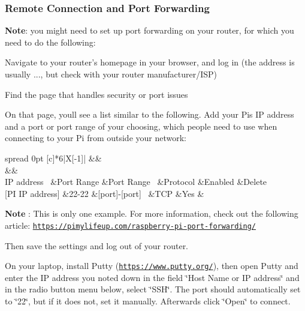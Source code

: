  \subsubsection*{Remote Connection and Port Forwarding}

{\bfseries Note}\+: you might need to set up port forwarding on your router, for which you need to do the following\+: 
\begin{DoxyEnumerate}
\item Navigate to your router’s homepage in your browser, and log in (the address is usually {...}, but check with your router manufacturer/\+I\+SP) 
\item Find the page that handles security or port issues 
\item On that page, you\textquotesingle{}ll see a list similar to the following. Add your Pi\textquotesingle{}s IP address and a port or port range of your choosing, which people need to use when connecting to your Pi from outside your network\+: \tabulinesep=1mm
\begin{longtabu} spread 0pt [c]{*{6}{|X[-1]}|}
\hline
\rowcolor{\tableheadbgcolor}&&\\
\endfirsthead
\hline
\endfoot
\hline
\rowcolor{\tableheadbgcolor}&&\\
\endhead
IP address~\newline
 &Port Range &Port Range~\newline
 &Protocol &Enabled &Delete  \\
\mbox{[}PI IP address\mbox{]} &22-\/22 &\mbox{[}port\mbox{]}-\/\mbox{[}port\mbox{]}~\newline
 &T\+CP &Yes &\\
\end{longtabu}
{\bfseries Note} \+: This is only one example. For more information, check out the following article\+: \href{https://pimylifeup.com/raspberry-pi-port-forwarding/}{\tt https\+://pimylifeup.\+com/raspberry-\/pi-\/port-\/forwarding/}  
\item Then save the settings and log out of your router. 
\end{DoxyEnumerate}On your laptop, install Putty (\href{https://www.putty.org/}{\tt https\+://www.\+putty.\+org/}), then open Putty and enter the IP address you noted down in the field \char`\"{}\+Host Name or I\+P address\char`\"{} and in the radio button menu below, select \char`\"{}\+S\+S\+H\char`\"{}. The port should automatically set to \char`\"{}22\char`\"{}, but if it does not, set it manually. Afterwards click \char`\"{}\+Open\char`\"{} to connect.

